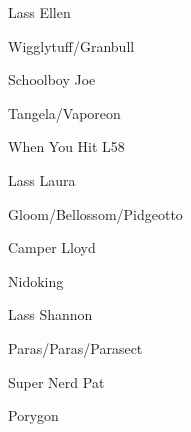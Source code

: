 \begin{paracol}{2}
\begin{trainer}{Lass Ellen}
	\varwb
	\begin{fightSection}{Wigglytuff/Granbull}
		\item {} \surf{} 
	\end{fightSection}
	\varwe
\end{trainer}

\begin{trainer}{Schoolboy Joe}
	\varwb
	\begin{fightSection}{Tangela/Vaporeon}
		\item {} \return{} 
	\end{fightSection}
	\varwe
\end{trainer}

\switchcolumn*
\vspace{2.3cm}
\begin{misc}{When You Hit L58}
	\varwb
	\begin{notes}
		\item {}
	\end{notes}
	\varwe
\end{misc}

\switchcolumn
\begin{trainer}{Lass Laura}
	\varwb
	\begin{fightSection}{Gloom/Bellossom/Pidgeotto}
		\item {} \strength{} 
	\end{fightSection}
	\varwe
\end{trainer}

\begin{trainer}{Camper Lloyd}
	\varwb
	\begin{fightSection}{Nidoking}
		\item {} \return
	\end{fightSection}
	\varwe
\end{trainer}

\begin{trainer}{Lass Shannon}
	\varwb
	\begin{fightSection}{Paras/Paras/Parasect}
		\item {} \strength{} 
	\end{fightSection}
	\varwe
\end{trainer}

\begin{trainer}{Super Nerd Pat}
	\varwb
	\begin{fightSection}{Porygon}
		\item {} \return
	\end{fightSection}
	\varwe
\end{trainer}


\end{paracol}
